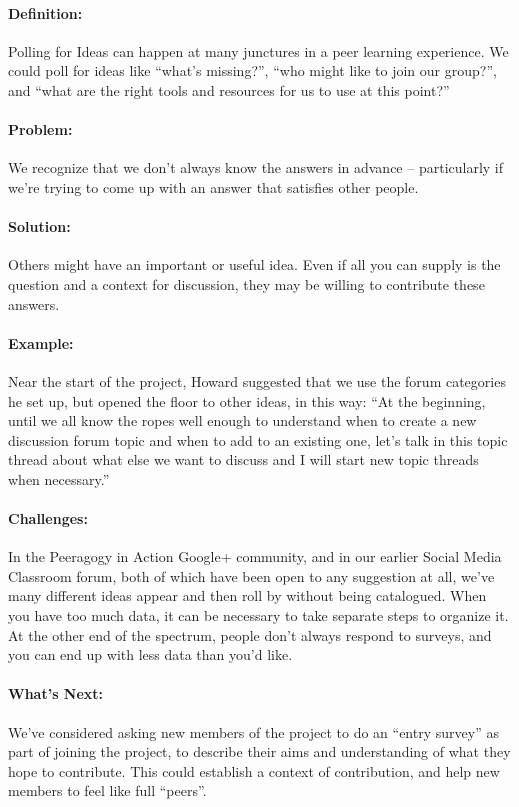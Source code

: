 \paragraph{Definition:} Polling for Ideas can happen at many junctures in a
peer learning experience. We could poll for ideas like ``what's
missing?'', ``who might like to join our group?'', and ``what are the
right tools and resources for us to use at this point?''

\paragraph{Problem:} We recognize that we don't always know the answers in
advance -- particularly if we're trying to come up with an answer that
satisfies other people.

\paragraph{Solution:} Others might have an important or useful idea. Even
if all you can supply is the question and a context for discussion, they
may be willing to contribute these answers.

\paragraph{Example:} Near the start of the project, Howard suggested that
we use the forum categories he set up, but opened the floor to other
ideas, in this way: ``At the beginning, until we all know the ropes well
enough to understand when to create a new discussion forum topic and
when to add to an existing one, let's talk in this topic thread about
what else we want to discuss and I will start new topic threads when
necessary.''

\paragraph{Challenges:} In the Peeragogy in Action Google+ community, and
in our earlier Social Media Classroom forum, both of which have been
open to any suggestion at all, we've many different ideas appear and
then roll by without being catalogued. When you have too much data, it
can be necessary to take separate steps to organize it. At the other end
of the spectrum, people don't always respond to surveys, and you can end
up with less data than you'd like.

\paragraph{What's Next:} We've considered asking new members of the project
to do an ``entry survey'' as part of joining the project, to describe
their aims and understanding of what they hope to contribute. This could
establish a context of contribution, and help new members to feel like
full ``peers''.
